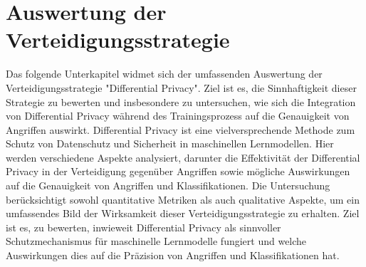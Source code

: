\section{Auswertung der Verteidigungsstrategie}\label{chpt:dpnn_stats}
Das folgende Unterkapitel widmet sich der umfassenden Auswertung der Verteidigungsstrategie "Differential Privacy". Ziel ist es, die Sinnhaftigkeit dieser Strategie zu bewerten und insbesondere zu untersuchen, wie sich die Integration von Differential Privacy während des Trainingsprozess auf die Genauigkeit von Angriffen auswirkt. Differential Privacy ist eine vielversprechende Methode zum Schutz von Datenschutz und Sicherheit in maschinellen Lernmodellen. Hier werden verschiedene Aspekte analysiert, darunter die Effektivität der Differential Privacy in der Verteidigung gegenüber Angriffen sowie mögliche Auswirkungen auf die Genauigkeit von Angriffen und Klassifikationen. Die Untersuchung berücksichtigt sowohl quantitative Metriken als auch qualitative Aspekte, um ein umfassendes Bild der Wirksamkeit dieser Verteidigungsstrategie zu erhalten. Ziel ist es, zu bewerten, inwieweit Differential Privacy als sinnvoller Schutzmechanismus für maschinelle Lernmodelle fungiert und welche Auswirkungen dies auf die Präzision von Angriffen und Klassifikationen hat.

